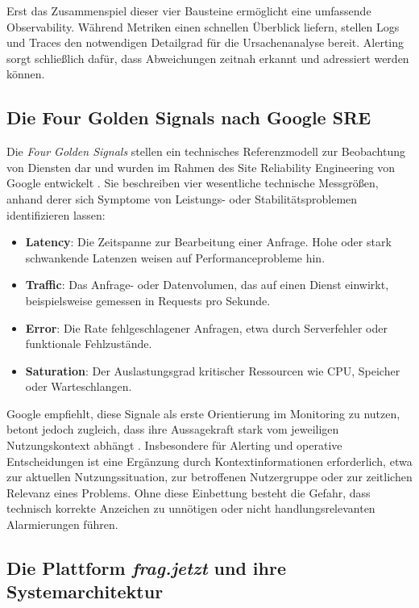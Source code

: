 Erst das Zusammenspiel dieser vier Bausteine ermöglicht eine umfassende Observability. Während Metriken einen schnellen Überblick liefern, stellen Logs und Traces den notwendigen Detailgrad für die Ursachenanalyse bereit. Alerting sorgt schließlich dafür, dass Abweichungen zeitnah erkannt und adressiert werden können.

\subsection{Die Four Golden Signals nach Google SRE}

Die \emph{Four Golden Signals} stellen ein technisches Referenzmodell zur Beobachtung von Diensten dar und wurden im Rahmen des Site Reliability Engineering von Google entwickelt \cite{ewaschukMonitoringDistributedSystems}. Sie beschreiben vier wesentliche technische Messgrößen, anhand derer sich Symptome von Leistungs- oder Stabilitätsproblemen identifizieren lassen:

\begin{itemize}
\item \textbf{Latency}: Die Zeitspanne zur Bearbeitung einer Anfrage. Hohe oder stark schwankende Latenzen weisen auf Performanceprobleme hin.
\item \textbf{Traffic}: Das Anfrage- oder Datenvolumen, das auf einen Dienst einwirkt, beispielsweise gemessen in Requests pro Sekunde.
\item \textbf{Error}: Die Rate fehlgeschlagener Anfragen, etwa durch Serverfehler oder funktionale Fehlzustände.
\item \textbf{Saturation}: Der Auslastungsgrad kritischer Ressourcen wie CPU, Speicher oder Warteschlangen.
\end{itemize}

Google empfiehlt, diese Signale als erste Orientierung im Monitoring zu nutzen, betont jedoch zugleich, dass ihre Aussagekraft stark vom jeweiligen Nutzungskontext abhängt \cite{ewaschukMonitoringDistributedSystems}. Insbesondere für Alerting und operative Entscheidungen ist eine Ergänzung durch Kontextinformationen erforderlich, etwa zur aktuellen Nutzungssituation, zur betroffenen Nutzergruppe oder zur zeitlichen Relevanz eines Problems. Ohne diese Einbettung besteht die Gefahr, dass technisch korrekte Anzeichen zu unnötigen oder nicht handlungsrelevanten Alarmierungen führen.

\subsection{Die Plattform \textit{frag.jetzt} und ihre Systemarchitektur}

